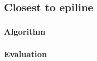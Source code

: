 \subsection{Closest to epiline}
\label{sec:match:epiline}

\subsubsection{Algorithm}

\subsubsection{Evaluation}
